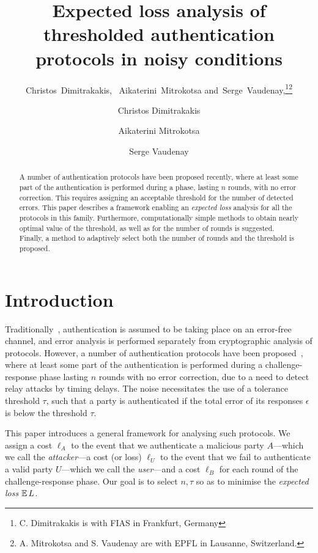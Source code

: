 \documentclass[a4paper]{article}
\title{Expected loss analysis of thresholded authentication protocols in noisy conditions}
\author{Christos~Dimitrakakis,~\IEEEmembership{Member,~IEEE,}
  Aikaterini~Mitrokotsa
  and~Serge~Vaudenay,\thanks{C. Dimitrakakis is with FIAS in Frankfurt, Germany}\thanks{A. Mitrokotsa and S. Vaudenay are with EPFL in Lausanne, Switzerland.}}
\author{Christos Dimitrakakis \and Aikaterini Mitrokotsa \and Serge Vaudenay}
\newcommand\E{\mathop{\mbox{\ensuremath{\mathbb{E}}}}\nolimits}
\newcommand \thr {\tau}
\newcommand \LA {\ell_A}
\newcommand \LU {\ell_U}
\newcommand \LB {\ell_B}
\theoremstyle{plain} \newtheorem{remark}{Remark}
\theoremstyle{plain} \newtheorem{definition}{Definition}
\theoremstyle{plain} \newtheorem{example}{Example}
\theoremstyle{plain} \newtheorem{assumption}{Assumption}
\theoremstyle{plain} \newtheorem{conjecture}{Conjecture}
\theoremstyle{plain} \newtheorem{theorem}{Theorem}
\theoremstyle{plain} \newtheorem{proposition}{Proposition}
\theoremstyle{plain} \newtheorem{lemma}{Lemma}
\theoremstyle{plain} \newtheorem{corollary}{Corollary}
\begin{document}
\maketitle
\begin{abstract}
  A number of authentication protocols have been proposed recently,
  where at least some part of the authentication is performed during a
  phase, lasting $n$ rounds, with no error correction. This requires
  assigning an acceptable threshold for the number of detected
  errors. This paper describes a framework enabling an
  \textit{expected loss} analysis for all the protocols in this
  family. Furthermore, computationally simple methods to obtain nearly
  optimal value of the threshold, as well as for the number of rounds
  is suggested. Finally, a method to adaptively select both the number
  of rounds and the threshold is proposed.
\end{abstract}


\section{Introduction}

Traditionally~\cite{stallings:cryptography,stinson:cryptography},
authentication is assumed to be taking place on an error-free channel,
and error analysis is performed separately from cryptographic analysis
of protocols.  However, a number of authentication protocols have been
proposed~\cite{brands94, bussard, singelee1,tippenhauer,
  sheddingLight,
  cryptoeprint:2009:310,hancke05,reid2007,KimAKSP-2008-icisc}, where
at least some part of the authentication is performed during a
challenge-response phase lasting $n$ rounds with no error correction,
due to a need to detect relay attacks by timing delays.  The noise
necessitates the use of a tolerance threshold $\thr$, such that a
party is authenticated if the total error of its responses $\epsilon$
is below the threshold $\thr$.

This paper introduces a general framework for analysing such
protocols.  We assign a cost $\LA$ to the event that we authenticate a
malicious party $A$---which we call the {\em attacker}---a cost (or
loss) $\LU$ to the event that we fail to authenticate a valid party
$U$---which we call the {\em user}---and a cost $\LB$ for each round
of the challenge-response phase.  Our goal is to select $n, \tau$ so
as to minimise the \textit{expected loss} $\E L$.
\end{document}
